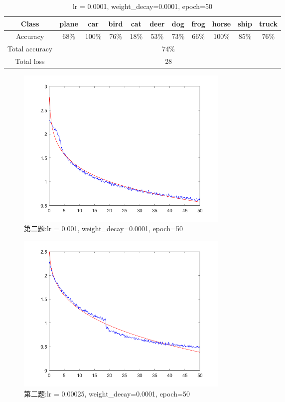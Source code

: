 \documentclass[a4paper,UTF8]{article}
\numberwithin{equation}{section}
\begin{document}
\begin{enumerate}[(1)]
	\begin{table}[!h]
	\centering
	\caption{lr = 0.0001, weight\_decay=0.0001, epoch=50}
	\label{p2.3}
	\begin{tabular}{|c|c|c|c|c|c|c|c|c|c|c|}
		\hline
		Class          & plane & car  & bird & cat  & deer & dog  & frog & horse & ship & truck \\ \hline
		Accuracy       & 68\%  & 100\% & 76\% & 18\% & 53\% & 73\% & 66\% & 100\%  & 85\% & 76\%  \\ \hline
		Total accuracy & \multicolumn{10}{c|}{74\%}                                             \\ \hline
		Total loss 	   & \multicolumn{10}{c|}{28}                                             \\ \hline
	\end{tabular}
	\end{table}

	\begin{figure}[!h]
	\centering   
	\includegraphics[width=0.5\textwidth, height=0.5\textwidth]{p21.png}  
	\caption{第二题:lr = 0.001, weight\_decay=0.0001, epoch=50} 
	\label{p21}
	\end{figure}

	\begin{figure}[!h]
	\centering   
	\includegraphics[width=0.5\textwidth, height=0.5\textwidth]{p22.png}  
	\caption{第二题:lr = 0.00025, weight\_decay=0.0001, epoch=50} 
	\label{p22}
	\end{figure}


\end{enumerate}
\end{document}

